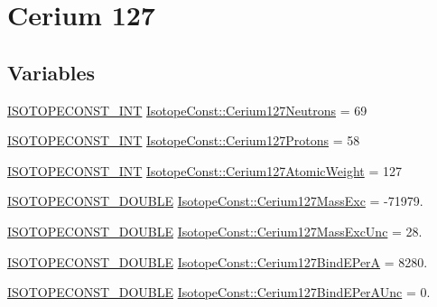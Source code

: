\hypertarget{group___isotope_const-_cerium-_ce127}{}\section{Cerium 127}
\label{group___isotope_const-_cerium-_ce127}
\subsection*{Variables}
\begin{DoxyCompactItemize}
\item 
\mbox{\hyperlink{group___isotope_const-_macros_ga5f18360b3e99483a35c32d789e62621c}{I\+S\+O\+T\+O\+P\+E\+C\+O\+N\+S\+T\+\_\+\+I\+NT}} \mbox{\hyperlink{group___isotope_const-_cerium-_ce127_ga03535246504bc518235868a2796e670a}{Isotope\+Const\+::\+Cerium127\+Neutrons}} = 69
\item 
\mbox{\hyperlink{group___isotope_const-_macros_ga5f18360b3e99483a35c32d789e62621c}{I\+S\+O\+T\+O\+P\+E\+C\+O\+N\+S\+T\+\_\+\+I\+NT}} \mbox{\hyperlink{group___isotope_const-_cerium-_ce127_ga9aa348093bdf331bca0ed32f12cb8aa5}{Isotope\+Const\+::\+Cerium127\+Protons}} = 58
\item 
\mbox{\hyperlink{group___isotope_const-_macros_ga5f18360b3e99483a35c32d789e62621c}{I\+S\+O\+T\+O\+P\+E\+C\+O\+N\+S\+T\+\_\+\+I\+NT}} \mbox{\hyperlink{group___isotope_const-_cerium-_ce127_ga4cdb3dfb6a12ae46719518a133f27d1e}{Isotope\+Const\+::\+Cerium127\+Atomic\+Weight}} = 127
\item 
\mbox{\hyperlink{group___isotope_const-_macros_ga8f45a7272ce02c0b4c65c44636ed719a}{I\+S\+O\+T\+O\+P\+E\+C\+O\+N\+S\+T\+\_\+\+D\+O\+U\+B\+LE}} \mbox{\hyperlink{group___isotope_const-_cerium-_ce127_ga485868bbec29c017184f4e6ca5e6b70d}{Isotope\+Const\+::\+Cerium127\+Mass\+Exc}} = -\/71979.
\item 
\mbox{\hyperlink{group___isotope_const-_macros_ga8f45a7272ce02c0b4c65c44636ed719a}{I\+S\+O\+T\+O\+P\+E\+C\+O\+N\+S\+T\+\_\+\+D\+O\+U\+B\+LE}} \mbox{\hyperlink{group___isotope_const-_cerium-_ce127_ga4f5bae89e619793e450bfed41fc520ce}{Isotope\+Const\+::\+Cerium127\+Mass\+Exc\+Unc}} = 28.
\item 
\mbox{\hyperlink{group___isotope_const-_macros_ga8f45a7272ce02c0b4c65c44636ed719a}{I\+S\+O\+T\+O\+P\+E\+C\+O\+N\+S\+T\+\_\+\+D\+O\+U\+B\+LE}} \mbox{\hyperlink{group___isotope_const-_cerium-_ce127_ga737f957bd7aef761c7e41172f3b8f291}{Isotope\+Const\+::\+Cerium127\+Bind\+E\+PerA}} = 8280.
\item 
\mbox{\hyperlink{group___isotope_const-_macros_ga8f45a7272ce02c0b4c65c44636ed719a}{I\+S\+O\+T\+O\+P\+E\+C\+O\+N\+S\+T\+\_\+\+D\+O\+U\+B\+LE}} \mbox{\hyperlink{group___isotope_const-_cerium-_ce127_gad1d7f626e6c9284c13d46b4e64a6c3b3}{Isotope\+Const\+::\+Cerium127\+Bind\+E\+Per\+A\+Unc}} = 0.

\end{DoxyCompactItemize}
